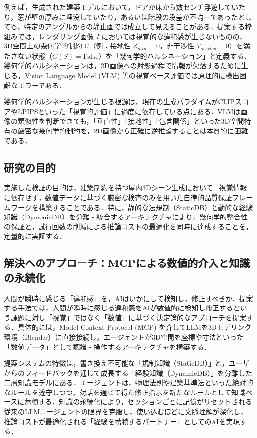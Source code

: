 \documentclass[dvipdfmx, a4paper, 9pt]{deimj}
\begin{document}
例えば，生成された建築モデルにおいて，ドアが床から数センチ浮遊していたり，窓が壁の厚みに埋没していたり，あるいは階段の段差が不均一であったとしても，特定のアングルからの静止画では成立して見えることがある．提案する枠組みでは，レンダリング画像 $I$ においては視覚的な違和感が生じないものの，3D空間上の幾何学的制約 $C$（例：接地性 $Z_{min}=0$，非干渉性 $V_{overlap}=0$）を満たさない状態（$C(S) = \text{False}$）を「幾何学的ハルシネーション」と定義する．幾何学的ハルシネーションは，2D画像への射影過程で情報が欠落するために生じる，Vision Language Model (VLM) 等の視覚ベース評価では原理的に検出困難なエラーである．

幾何学的ハルシネーションが生じる根源は，現在の生成パラダイムがCLIPスコア\cite{radford2021clip}やLPIPS\cite{zhang2018lpips}といった「視覚的評価」に過度に依存している点にある．VLMは画像の類似性を判断できても，「垂直性」「接地性」「包含関係」といった3D空間特有の厳密な幾何学的制約を，2D画像から正確に逆推論することは本質的に困難である．

\subsection{研究の目的}

実施した検証の目的は，建築制約を持つ屋内3Dシーン生成において，視覚情報に依存せず，数値データに基づく厳密な検査のみを用いた自律的品質保証フレームワークを構築することである．特に，静的な法規制（StaticDB）と動的な経験知識（DynamicDB）を分離・統合するアーキテクチャにより，幾何学的整合性の保証と，試行回数の削減による推論コストの最適化を同時に達成することを，定量的に実証する．

\subsection{解決へのアプローチ：MCPによる数値的介入と知識の永続化}

人間が瞬時に感じる「違和感」を，AIはいかにして検知し，修正すべきか．提案する手法では，人間が瞬時に感じる違和感をAIが数値的に検知し修正するという課題に対し「視覚」ではなく「数値」に基づく決定論的なアプローチを提案する．具体的には，Model Context Protocol (MCP)\cite{anthropic2024mcp} を介してLLMを3Dモデリング環境（Blender）に直接接続し，エージェントが3D空間を座標や寸法といった「数値データ」として認識・操作するアーキテクチャを構築する．

提案システムの特徴は，書き換え不可能な「規制知識（StaticDB）」と，ユーザからのフィードバックを通じて成長する「経験知識（DynamicDB）」を分離した二層知識モデルにある．エージェントは，物理法則や建築基準法といった絶対的なルールを遵守しつつ，対話を通じて得た修正指示を新たなルールとして知識ベースに蓄積する．知識の永続化により，セッションごとに記憶がリセットされる従来のLLMエージェントの限界を克服し，使い込むほどに文脈理解が深化し，推論コストが最適化される「経験を蓄積するパートナー」としてのAIを実現する．
\end{document}
